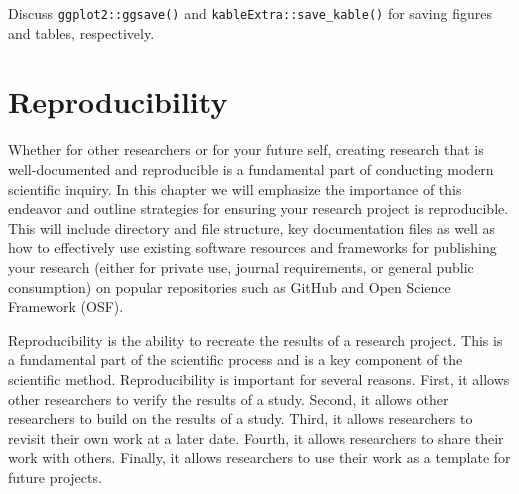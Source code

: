 \documentclass[
  letterpaper,
  DIV=11,
  numbers=noendperiod]{scrreprt}
\theoremstyle{definition}
\theoremstyle{remark}
\begin{document}
Discuss \texttt{ggplot2::ggsave()} and
\texttt{kableExtra::save\_kable()} for saving figures and tables,
respectively.

\section{Reproducibility}\label{sec-contr-reproducibility}

Whether for other researchers or for your future self, creating research
that is well-documented and reproducible is a fundamental part of
conducting modern scientific inquiry. In this chapter we will emphasize
the importance of this endeavor and outline strategies for ensuring your
research project is reproducible. This will include directory and file
structure, key documentation files as well as how to effectively use
existing software resources and frameworks for publishing your research
(either for private use, journal requirements, or general public
consumption) on popular repositories such as GitHub and Open Science
Framework (OSF).

Reproducibility is the ability to recreate the results of a research
project. This is a fundamental part of the scientific process and is a
key component of the scientific method. Reproducibility is important for
several reasons. First, it allows other researchers to verify the
results of a study. Second, it allows other researchers to build on the
results of a study. Third, it allows researchers to revisit their own
work at a later date. Fourth, it allows researchers to share their work
with others. Finally, it allows researchers to use their work as a
template for future projects.
\end{document}
